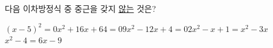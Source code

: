 다음 이차방정식 중 중근을 갖지 \underline{않는} 것은?
\begin{choicesii}{$(x-5)^2=0$}{$x^2+16x+64=0$}{$9x^2-12x+4=0$}{$2x^2-x+1=x^2-3x$}{$x^2-4=6x-9$}\end{choicesii}
